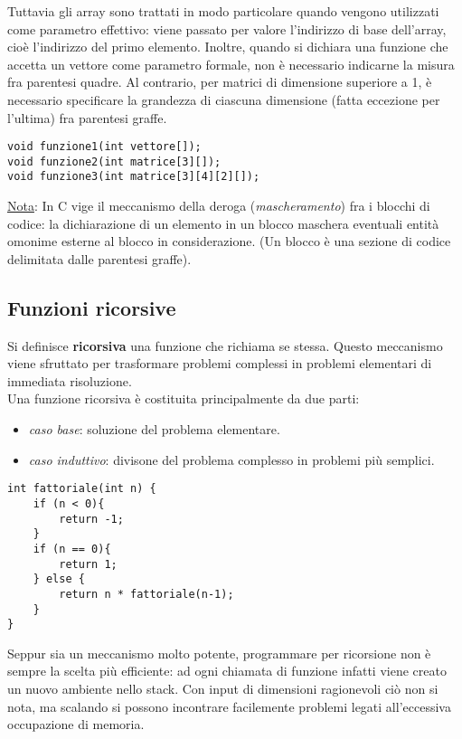 Tuttavia gli array sono trattati in modo particolare quando vengono utilizzati come parametro effettivo: viene passato per valore l’indirizzo di base dell’array, cioè l’indirizzo del primo elemento. Inoltre, quando si dichiara una funzione che accetta un vettore come parametro formale, non è necessario indicarne la misura fra parentesi quadre. Al contrario, per matrici di dimensione superiore a 1, è necessario specificare la grandezza di ciascuna dimensione (fatta eccezione per l'ultima) fra parentesi graffe.
\begin{lstlisting}[title={Dichiarazione di funzioni con vettori e matrici come parametri formali}]
void funzione1(int vettore[]);
void funzione2(int matrice[3][]);
void funzione3(int matrice[3][4][2][]);
\end{lstlisting}

\underline{Nota}: In C vige il meccanismo della deroga (\textit{mascheramento}) fra i blocchi di codice: la dichiarazione di un elemento in un blocco maschera eventuali entità omonime esterne al blocco in considerazione. (Un blocco è una sezione di codice delimitata dalle parentesi graffe).

\subsection{Funzioni ricorsive}
Si definisce \textbf{ricorsiva} una funzione che richiama se stessa. Questo meccanismo viene sfruttato per trasformare problemi complessi in problemi elementari di immediata risoluzione.\\
Una funzione ricorsiva è costituita principalmente da due parti:
\begin{itemize}[noitemsep]
	\item \textit{caso base}: soluzione del problema elementare.
	\item \textit{caso induttivo}: divisone del problema complesso in problemi più semplici.
\end{itemize}

\begin{lstlisting}[title={Calcolo del fattoriale di un numero implementato ricorsivamente}]
int fattoriale(int n) {
    if (n < 0){
        return -1;
    }
    if (n == 0){
        return 1;
    } else {
        return n * fattoriale(n-1);
    }
}
\end{lstlisting}
Seppur sia un meccanismo molto potente, programmare per ricorsione non è sempre la scelta più efficiente: ad ogni chiamata di funzione infatti viene creato un nuovo ambiente nello stack. Con input di dimensioni ragionevoli ciò non si nota, ma scalando si possono incontrare facilemente problemi legati all'eccessiva occupazione di memoria.

